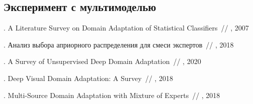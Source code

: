 \documentclass[12pt, twoside]{article}
\begin{document}
\subsection{Эксперимент с мультимоделью}


\begin{thebibliography}{99}


    .
   A Literature Survey on Domain Adaptation of Statistical Classifiers~//
    , 2007 %
    
    .
   Анализ выбора априорного распределения для смеси экспертов~//
    , 2018 %

    .
   A Survey of Unsupervised Deep Domain Adaptation~//
    , 2020
    
    .
   Deep Visual Domain Adaptation: A Survey~//
    , 2018
    
    .
   Multi-Source Domain Adaptation with Mixture of Experts~//
    , 2018
 
 	
\end{thebibliography}

\end{document}
